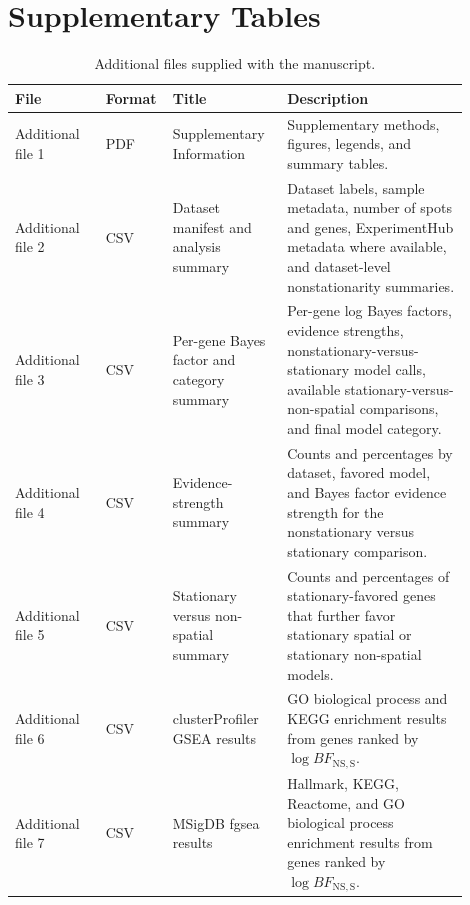 \section{Supplementary Tables}


\begin{landscape}
\end{landscape}


\begin{landscape}
\end{landscape}

\begin{table}[htbp]
\centering
\small
\caption{Additional files supplied with the manuscript.}\label{tab:additional-files}
\begin{tabular}{p{0.19\linewidth}p{0.09\linewidth}p{0.24\linewidth}p{0.38\linewidth}}
\toprule
File & Format & Title & Description\\
\midrule
Additional file 1 & PDF & Supplementary Information & Supplementary methods, figures, legends, and summary tables.\\
Additional file 2 & CSV & Dataset manifest and analysis summary & Dataset labels, sample metadata, number of spots and genes, ExperimentHub metadata where available, and dataset-level nonstationarity summaries.\\
Additional file 3 & CSV & Per-gene Bayes factor and category summary & Per-gene log Bayes factors, evidence strengths, nonstationary-versus-stationary model calls, available stationary-versus-non-spatial comparisons, and final model category.\\
Additional file 4 & CSV & Evidence-strength summary & Counts and percentages by dataset, favored model, and Bayes factor evidence strength for the nonstationary versus stationary comparison.\\
Additional file 5 & CSV & Stationary versus non-spatial summary & Counts and percentages of stationary-favored genes that further favor stationary spatial or stationary non-spatial models.\\
Additional file 6 & CSV & clusterProfiler GSEA results & GO biological process and KEGG enrichment results from genes ranked by \(\log BF_{\mathrm{NS,S}}\).\\
Additional file 7 & CSV & MSigDB fgsea results & Hallmark, KEGG, Reactome, and GO biological process enrichment results from genes ranked by \(\log BF_{\mathrm{NS,S}}\).\\

\end{tabular}
\end{table}
